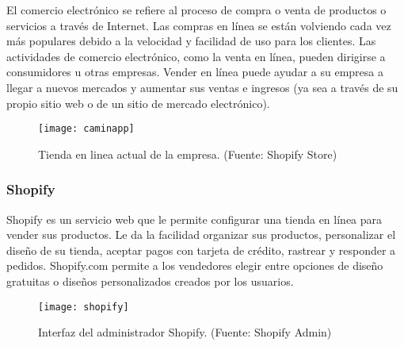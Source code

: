 El comercio electrónico se refiere al proceso de compra o venta de productos o servicios a través de Internet. Las compras en línea se están volviendo cada vez más populares debido a la velocidad y facilidad de uso para los clientes. Las actividades de comercio electrónico, como la venta en línea, pueden dirigirse a consumidores u otras empresas. Vender en línea puede ayudar a su empresa a llegar a nuevos mercados y aumentar sus ventas e ingresos (ya sea a través de su propio sitio web o de un sitio de mercado electrónico).

\begin{figure}[H]
  \centering
  \texttt{[image: caminapp]}
  \caption{Tienda en linea actual de la empresa. (Fuente: Shopify Store)}
\end{figure}

\subsubsection{Shopify}
Shopify es un servicio web que le permite configurar una tienda en línea para vender sus productos. 
Le da la facilidad organizar sus productos, personalizar el diseño de su tienda, 
aceptar pagos con tarjeta de crédito, rastrear y responder a pedidos. 
Shopify.com permite a los vendedores elegir entre opciones de diseño gratuitas 
o diseños personalizados creados por los usuarios.

\begin{figure}[H]
  \centering
  \texttt{[image: shopify]}
  \caption{Interfaz del administrador Shopify. (Fuente: Shopify Admin)}
\end{figure}
